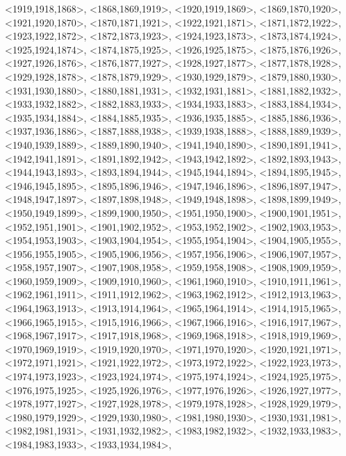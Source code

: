 \documentclass[a4paper,10pt]{article}
\begin{document}
\begin{eulernotebook}
\begin{euleroutput}
  <1919,1918,1868>,
  <1868,1869,1919>,
  <1920,1919,1869>,
  <1869,1870,1920>,
  <1921,1920,1870>,
  <1870,1871,1921>,
  <1922,1921,1871>,
  <1871,1872,1922>,
  <1923,1922,1872>,
  <1872,1873,1923>,
  <1924,1923,1873>,
  <1873,1874,1924>,
  <1925,1924,1874>,
  <1874,1875,1925>,
  <1926,1925,1875>,
  <1875,1876,1926>,
  <1927,1926,1876>,
  <1876,1877,1927>,
  <1928,1927,1877>,
  <1877,1878,1928>,
  <1929,1928,1878>,
  <1878,1879,1929>,
  <1930,1929,1879>,
  <1879,1880,1930>,
  <1931,1930,1880>,
  <1880,1881,1931>,
  <1932,1931,1881>,
  <1881,1882,1932>,
  <1933,1932,1882>,
  <1882,1883,1933>,
  <1934,1933,1883>,
  <1883,1884,1934>,
  <1935,1934,1884>,
  <1884,1885,1935>,
  <1936,1935,1885>,
  <1885,1886,1936>,
  <1937,1936,1886>,
  <1887,1888,1938>,
  <1939,1938,1888>,
  <1888,1889,1939>,
  <1940,1939,1889>,
  <1889,1890,1940>,
  <1941,1940,1890>,
  <1890,1891,1941>,
  <1942,1941,1891>,
  <1891,1892,1942>,
  <1943,1942,1892>,
  <1892,1893,1943>,
  <1944,1943,1893>,
  <1893,1894,1944>,
  <1945,1944,1894>,
  <1894,1895,1945>,
  <1946,1945,1895>,
  <1895,1896,1946>,
  <1947,1946,1896>,
  <1896,1897,1947>,
  <1948,1947,1897>,
  <1897,1898,1948>,
  <1949,1948,1898>,
  <1898,1899,1949>,
  <1950,1949,1899>,
  <1899,1900,1950>,
  <1951,1950,1900>,
  <1900,1901,1951>,
  <1952,1951,1901>,
  <1901,1902,1952>,
  <1953,1952,1902>,
  <1902,1903,1953>,
  <1954,1953,1903>,
  <1903,1904,1954>,
  <1955,1954,1904>,
  <1904,1905,1955>,
  <1956,1955,1905>,
  <1905,1906,1956>,
  <1957,1956,1906>,
  <1906,1907,1957>,
  <1958,1957,1907>,
  <1907,1908,1958>,
  <1959,1958,1908>,
  <1908,1909,1959>,
  <1960,1959,1909>,
  <1909,1910,1960>,
  <1961,1960,1910>,
  <1910,1911,1961>,
  <1962,1961,1911>,
  <1911,1912,1962>,
  <1963,1962,1912>,
  <1912,1913,1963>,
  <1964,1963,1913>,
  <1913,1914,1964>,
  <1965,1964,1914>,
  <1914,1915,1965>,
  <1966,1965,1915>,
  <1915,1916,1966>,
  <1967,1966,1916>,
  <1916,1917,1967>,
  <1968,1967,1917>,
  <1917,1918,1968>,
  <1969,1968,1918>,
  <1918,1919,1969>,
  <1970,1969,1919>,
  <1919,1920,1970>,
  <1971,1970,1920>,
  <1920,1921,1971>,
  <1972,1971,1921>,
  <1921,1922,1972>,
  <1973,1972,1922>,
  <1922,1923,1973>,
  <1974,1973,1923>,
  <1923,1924,1974>,
  <1975,1974,1924>,
  <1924,1925,1975>,
  <1976,1975,1925>,
  <1925,1926,1976>,
  <1977,1976,1926>,
  <1926,1927,1977>,
  <1978,1977,1927>,
  <1927,1928,1978>,
  <1979,1978,1928>,
  <1928,1929,1979>,
  <1980,1979,1929>,
  <1929,1930,1980>,
  <1981,1980,1930>,
  <1930,1931,1981>,
  <1982,1981,1931>,
  <1931,1932,1982>,
  <1983,1982,1932>,
  <1932,1933,1983>,
  <1984,1983,1933>,
  <1933,1934,1984>,

\end{euleroutput}
\end{eulernotebook}
\end{document}
